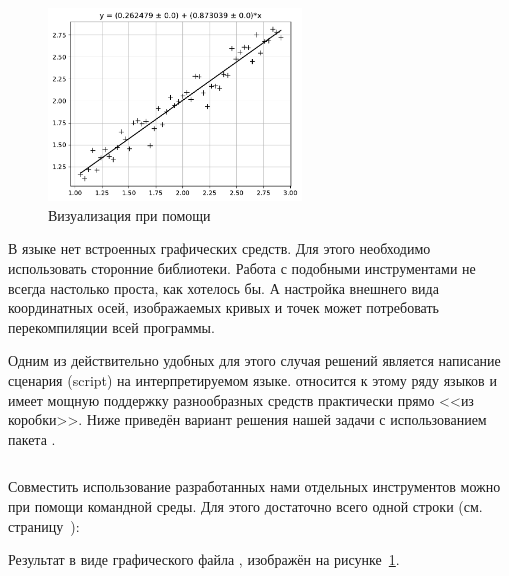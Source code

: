 \begin{figure}[ht]
  {\centering
    \includegraphics[width=0.6\textwidth]{images/line_approx.pdf}

  }
  \caption{Визуализация при помощи }
  \label{fig:pyplot}
\end{figure}

В языке  нет встроенных графических средств. Для этого необходимо использовать сторонние библиотеки. Работа с подобными инструментами не всегда настолько проста, как хотелось бы. А настройка внешнего вида координатных осей, изображаемых кривых и точек может потребовать перекомпиляции всей программы.

Одним из действительно удобных для этого случая решений является написание сценария (\textenglish{script}) на интерпретируемом языке. \href{\pythonurl}{} относится к этому ряду языков и имеет мощную поддержку разнообразных средств практически прямо <<из коробки>>. Ниже приведён вариант решения нашей задачи с использованием пакета \href{\matplotliburl}{}.

\begin{center}
\end{center}

\inputminted[linenos, fontsize=\small]{py}{01/src/plot.py}

Совместить использование разработанных нами отдельных инструментов можно при помощи командной среды. Для этого достаточно всего одной строки (см. страницу~\pageref{sect:shell}):

\noindent Результат в виде графического файла , изображён на рисунке~\ref{fig:pyplot}.
